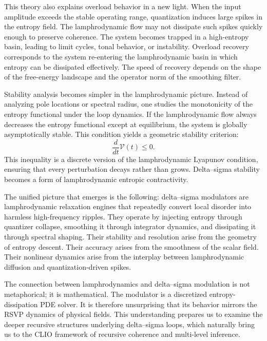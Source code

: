 This theory also explains overload behavior in a new light. When the input amplitude exceeds the stable operating range, quantization induces large spikes in the entropy field. The lamphrodynamic flow may not dissipate such spikes quickly enough to preserve coherence. The system becomes trapped in a high-entropy basin, leading to limit cycles, tonal behavior, or instability. Overload recovery corresponds to the system re-entering the lamphrodynamic basin in which entropy can be dissipated effectively. The speed of recovery depends on the shape of the free-energy landscape and the operator norm of the smoothing filter.

Stability analysis becomes simpler in the lamphrodynamic picture. Instead of analyzing pole locations or spectral radius, one studies the monotonicity of the entropy functional under the loop dynamics. If the lamphrodynamic flow always decreases the entropy functional except at equilibrium, the system is globally asymptotically stable. This condition yields a geometric stability criterion:
\[
\frac{d}{dt} \mathcal{V}(t) \leq 0.
\]
This inequality is a discrete version of the lamphrodynamic Lyapunov condition, ensuring that every perturbation decays rather than grows. Delta–sigma stability becomes a form of lamphrodynamic entropic contractivity.

The unified picture that emerges is the following: delta–sigma modulators are lamphrodynamic relaxation engines that repeatedly convert local disorder into harmless high-frequency ripples. They operate by injecting entropy through quantizer collapse, smoothing it through integrator dynamics, and dissipating it through spectral shaping. Their stability and resolution arise from the geometry of entropy descent. Their accuracy arises from the smoothness of the scalar field. Their nonlinear dynamics arise from the interplay between lamphrodynamic diffusion and quantization-driven spikes.

The connection between lamphrodynamics and delta–sigma modulation is not metaphorical; it is mathematical. The modulator is a discretized entropy-dissipation PDE solver. It is therefore unsurprising that its behavior mirrors the RSVP dynamics of physical fields. This understanding prepares us to examine the deeper recursive structures underlying delta–sigma loops, which naturally bring us to the CLIO framework of recursive coherence and multi-level inference.


